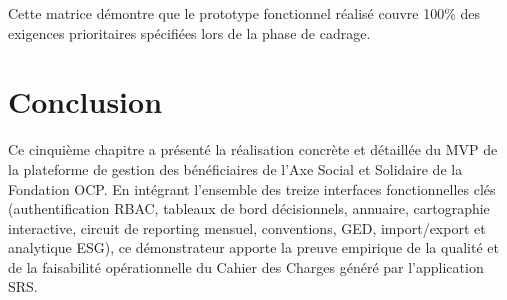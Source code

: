 Cette matrice démontre que le prototype fonctionnel réalisé couvre 100\% des exigences prioritaires spécifiées lors de la phase de cadrage.

\section{Conclusion}

Ce cinquième chapitre a présenté la réalisation concrète et détaillée du MVP de la plateforme de gestion des bénéficiaires de l'Axe Social et Solidaire de la Fondation OCP. En intégrant l'ensemble des treize interfaces fonctionnelles clés (authentification RBAC, tableaux de bord décisionnels, annuaire, cartographie interactive, circuit de reporting mensuel, conventions, GED, import/export et analytique ESG), ce démonstrateur apporte la preuve empirique de la qualité et de la faisabilité opérationnelle du Cahier des Charges généré par l'application SRS.

\newpage

